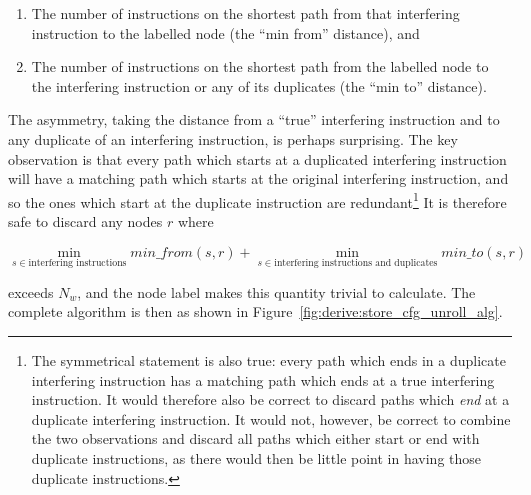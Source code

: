\begin{enumerate}
\item
  The number of instructions on the shortest path from that
  interfering instruction to the labelled node (the ``min from''
  distance), and
\item
  The number of instructions on the shortest path from the labelled
  node to the interfering instruction or any of its duplicates (the
  ``min to'' distance).
\end{enumerate}


The asymmetry, taking the distance from a ``true'' interfering
instruction and to any duplicate of an interfering instruction, is
perhaps surprising.  The key observation is that every path which
starts at a duplicated interfering instruction will have a matching
path which starts at the original interfering instruction, and so the
ones which start at the duplicate instruction are
redundant\footnote{The symmetrical statement is also true: every path
  which ends in a duplicate interfering instruction has a matching
  path which ends at a true interfering instruction.  It would
  therefore also be correct to discard paths which \emph{end} at a
  duplicate interfering instruction.  It would not, however, be
  correct to combine the two observations and discard all paths which
  either start or end with duplicate instructions, as there would then
  be little point in having those duplicate instructions.}  It is
therefore safe to discard any nodes $r$ where

\begin{displaymath}
\min_{s \in \textrm{interfering instructions}}min\_from(s, r) + \min_{s \in \textrm{interfering instructions and duplicates}}min\_to(s, r)
\end{displaymath}

exceeds $N_w$, and the node label makes this quantity trivial to
calculate.  The complete algorithm is then as shown in
Figure~\ref{fig:derive:store_cfg_unroll_alg}.


